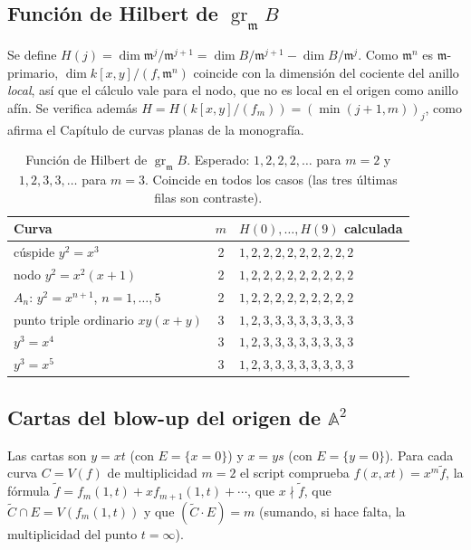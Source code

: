 \documentclass[11pt,a4paper]{article}
\newcommand{\gr}{\operatorname{gr}}
\newcommand{\A}{\mathbb{A}}
\newcommand{\m}{\mathfrak{m}}
\theoremstyle{plain}
\theoremstyle{definition}
\theoremstyle{remark}
\begin{document}
\subsection{Función de Hilbert de \texorpdfstring{$\gr_\m B$}{gr B}}\label{sec:hilbert}

Se define $H(j)=\dim\m^j/\m^{j+1}=\dim B/\m^{j+1}-\dim B/\m^j$. Como $\m^n$ es $\m$-primario, $\dim k[x,y]/(f,\m^n)$ coincide con la dimensión del cociente del anillo \emph{local}, así que el cálculo vale para el nodo, que no es local en el origen como anillo afín. Se verifica además $H=H(k[x,y]/(f_m))=(\min(j+1,m))_j$, como afirma el Capítulo de curvas planas de la monografía.

\begin{table}[ht]
\centering
\small
\begin{tabular}{@{}l c l@{}}
\toprule
Curva & $m$ & $H(0),\dots,H(9)$ calculada \\
\midrule
cúspide $y^2=x^3$ & 2 & $1,2,2,2,2,2,2,2,2,2$ \\
nodo $y^2=x^2(x+1)$ & 2 & $1,2,2,2,2,2,2,2,2,2$ \\
$A_n$: $y^2=x^{n+1}$, $n=1,\dots,5$ & 2 & $1,2,2,2,2,2,2,2,2,2$ \\
\midrule
punto triple ordinario $xy(x+y)$ & 3 & $1,2,3,3,3,3,3,3,3,3$ \\
$y^3=x^4$ & 3 & $1,2,3,3,3,3,3,3,3,3$ \\
$y^3=x^5$ & 3 & $1,2,3,3,3,3,3,3,3,3$ \\
\bottomrule
\end{tabular}
\caption{Función de Hilbert de $\gr_\m B$. Esperado: $1,2,2,2,\dots$ para $m=2$ y $1,2,3,3,\dots$ para $m=3$. Coincide en todos los casos (las tres últimas filas son contraste).}
\end{table}

\subsection{Cartas del blow-up del origen de \texorpdfstring{$\A^2$}{A2}}\label{sec:cartas}

Las cartas son $y=xt$ (con $E=\{x=0\}$) y $x=ys$ (con $E=\{y=0\}$). Para cada curva $C=V(f)$ de multiplicidad $m=2$ el script comprueba $f(x,xt)=x^m\tilde f$, la fórmula $\tilde f=f_m(1,t)+xf_{m+1}(1,t)+\cdots$, que $x\nmid\tilde f$, que $\tilde C\cap E=V(f_m(1,t))$ y que $(\tilde C\cdot E)=m$ (sumando, si hace falta, la multiplicidad del punto $t=\infty$).
\end{document}
